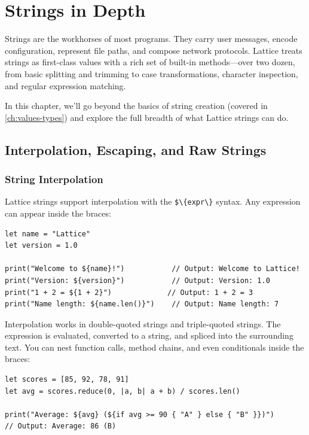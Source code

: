 \chapter{Strings in Depth}\label{ch:strings}


Strings are the workhorses of most programs. They carry user messages, encode configuration, represent file paths, and compose network protocols. Lattice treats strings as first-class values with a rich set of built-in methods---over two dozen, from basic splitting and trimming to case transformations, character inspection, and regular expression matching.

In this chapter, we'll go beyond the basics of string creation (covered in \cref{ch:values-types}) and explore the full breadth of what Lattice strings can do.

\section{Interpolation, Escaping, and Raw Strings}\label{sec:string-interpolation}

\subsection{String Interpolation}\label{sec:interpolation}

Lattice strings support interpolation with the \lstinline|$\{expr\}| syntax. Any expression can appear inside the braces:

\begin{lstlisting}[language=Lattice, caption={String interpolation}]
let name = "Lattice"
let version = 1.0

print("Welcome to ${name}!")           // Output: Welcome to Lattice!
print("Version: ${version}")           // Output: Version: 1.0
print("1 + 2 = ${1 + 2}")             // Output: 1 + 2 = 3
print("Name length: ${name.len()}")    // Output: Name length: 7
\end{lstlisting}

Interpolation works in double-quoted strings and triple-quoted strings. The expression is evaluated, converted to a string, and spliced into the surrounding text. You can nest function calls, method chains, and even conditionals inside the braces:

\begin{lstlisting}[language=Lattice, caption={Complex interpolation expressions}]
let scores = [85, 92, 78, 91]
let avg = scores.reduce(0, |a, b| a + b) / scores.len()

print("Average: ${avg} (${if avg >= 90 { "A" } else { "B" }})")
// Output: Average: 86 (B)
\end{lstlisting}


